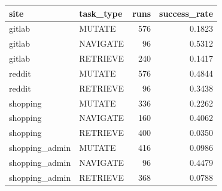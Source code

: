 \begin{tabular}{llrr}
\toprule
site & task_type & runs & success_rate \\
\midrule
gitlab & MUTATE & 576 & 0.1823 \\
gitlab & NAVIGATE & 96 & 0.5312 \\
gitlab & RETRIEVE & 240 & 0.1417 \\
reddit & MUTATE & 576 & 0.4844 \\
reddit & RETRIEVE & 96 & 0.3438 \\
shopping & MUTATE & 336 & 0.2262 \\
shopping & NAVIGATE & 160 & 0.4062 \\
shopping & RETRIEVE & 400 & 0.0350 \\
shopping_admin & MUTATE & 416 & 0.0986 \\
shopping_admin & NAVIGATE & 96 & 0.4479 \\
shopping_admin & RETRIEVE & 368 & 0.0788 \\
\bottomrule
\end{tabular}
